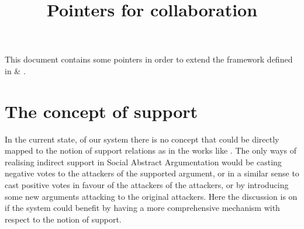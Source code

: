\documentclass{article}
\begin{document}
\title{Pointers for collaboration}

\maketitle

This document contains some pointers in order to extend the framework defined in \cite{leite2011social} \& \cite{eml2013esaf}.
\\
\section{The concept of support} %



In the current state, of our system there is no concept that could be directly mapped to the notion of support relations as in the works like \cite{DBLP:journals/ijis/AmgoudCLL08}. The only ways of realising indirect support in {\color{red}Social Abstract Argumentation} would be casting negative votes to the attackers of the supported argument, or in a similar sense to cast positive votes in favour of the attackers of the attackers{\color{red}, or by introducing some new arguments attacking to the original attackers}. Here the discussion is on if the system could benefit by having a more comprehensive mechanism with respect to the notion of support. 
\end{document}
